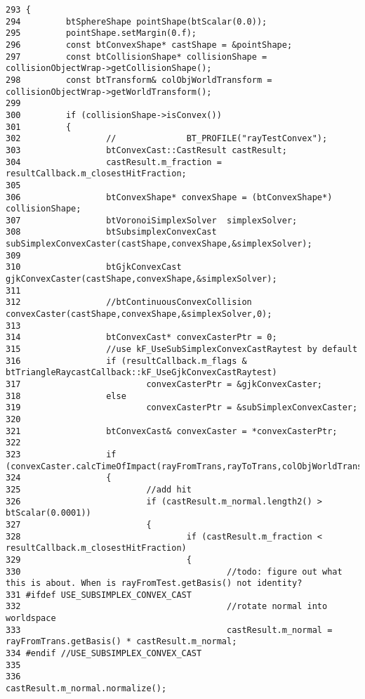 \begin{Code}\begin{verbatim}293 {
294         btSphereShape pointShape(btScalar(0.0));
295         pointShape.setMargin(0.f);
296         const btConvexShape* castShape = &pointShape;
297         const btCollisionShape* collisionShape = collisionObjectWrap->getCollisionShape();
298         const btTransform& colObjWorldTransform = collisionObjectWrap->getWorldTransform();
299 
300         if (collisionShape->isConvex())
301         {
302                 //              BT_PROFILE("rayTestConvex");
303                 btConvexCast::CastResult castResult;
304                 castResult.m_fraction = resultCallback.m_closestHitFraction;
305 
306                 btConvexShape* convexShape = (btConvexShape*) collisionShape;
307                 btVoronoiSimplexSolver  simplexSolver;
308                 btSubsimplexConvexCast subSimplexConvexCaster(castShape,convexShape,&simplexSolver);
309                 
310                 btGjkConvexCast gjkConvexCaster(castShape,convexShape,&simplexSolver);
311                 
312                 //btContinuousConvexCollision convexCaster(castShape,convexShape,&simplexSolver,0);
313 
314                 btConvexCast* convexCasterPtr = 0;
315                 //use kF_UseSubSimplexConvexCastRaytest by default
316                 if (resultCallback.m_flags & btTriangleRaycastCallback::kF_UseGjkConvexCastRaytest)
317                         convexCasterPtr = &gjkConvexCaster;
318                 else
319                         convexCasterPtr = &subSimplexConvexCaster;
320                 
321                 btConvexCast& convexCaster = *convexCasterPtr;
322 
323                 if (convexCaster.calcTimeOfImpact(rayFromTrans,rayToTrans,colObjWorldTransform,colObjWorldTransform,castResult))
324                 {
325                         //add hit
326                         if (castResult.m_normal.length2() > btScalar(0.0001))
327                         {
328                                 if (castResult.m_fraction < resultCallback.m_closestHitFraction)
329                                 {
330                                         //todo: figure out what this is about. When is rayFromTest.getBasis() not identity?
331 #ifdef USE_SUBSIMPLEX_CONVEX_CAST
332                                         //rotate normal into worldspace
333                                         castResult.m_normal = rayFromTrans.getBasis() * castResult.m_normal;
334 #endif //USE_SUBSIMPLEX_CONVEX_CAST
335 
336                                         castResult.m_normal.normalize();

\end{verbatim}
\end{Code}
